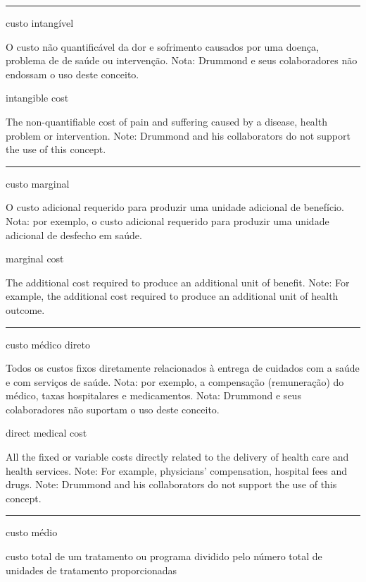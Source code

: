 \documentclass[
]{book}
\begin{document}
\begin{center}\rule{0.5\linewidth}{0.5pt}\end{center}

custo intangível

O custo não quantificável da dor e sofrimento causados por uma doença, problema de de saúde ou intervenção. Nota: Drummond e seus colaboradores não endossam o uso deste conceito.

intangible cost

The non-quantifiable cost of pain and suffering caused by a disease, health problem or intervention. Note: Drummond and his collaborators do not support the use of this concept.

\begin{center}\rule{0.5\linewidth}{0.5pt}\end{center}

custo marginal

O custo adicional requerido para produzir uma unidade adicional de benefício. Nota: por exemplo, o custo adicional requerido para produzir uma unidade adicional de desfecho em saúde.

marginal cost

The additional cost required to produce an additional unit of benefit. Note: For example, the additional cost required to produce an additional unit of health outcome.

\begin{center}\rule{0.5\linewidth}{0.5pt}\end{center}

custo médico direto

Todos os custos fixos diretamente relacionados à entrega de cuidados com a saúde e com serviços de saúde. Nota: por exemplo, a compensação (remuneração) do médico, taxas hospitalares e medicamentos. Nota: Drummond e seus colaboradores não suportam o uso deste conceito.

direct medical cost

All the fixed or variable costs directly related to the delivery of health care and health services. Note: For example, physicians' compensation, hospital fees and drugs. Note: Drummond and his collaborators do not support the use of this concept.

\begin{center}\rule{0.5\linewidth}{0.5pt}\end{center}

custo médio

custo total de um tratamento ou programa dividido pelo número total de unidades de tratamento proporcionadas
\end{document}
